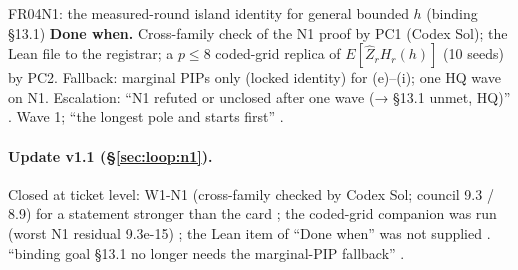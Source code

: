 \begin{card}{FR04}{N1: the measured-round island identity for general bounded $h$ (binding §13.1)}
\textbf{Done when.} Cross-family check of the N1 proof by PC1 (Codex Sol); the Lean file to the registrar; a $p\le8$ coded-grid replica of $E[\hat Z_r H_r(h)]$ (10 seeds) by PC2. Fallback: marginal PIPs only (locked identity) for (e)--(i); one HQ wave on N1. Escalation: ``N1 refuted or unclosed after one wave (→ §13.1 unmet, HQ)'' . Wave 1; ``the longest pole and starts first'' .
\paragraph{Update v1.1 (\S\ref{sec:loop:n1}).} Closed at ticket level: W1-N1  (cross-family checked by Codex Sol; council 9.3 / 8.9) for a statement stronger than the card ; the coded-grid companion was run (worst N1 residual 9.3e-15) ; the Lean item of ``Done when'' was not supplied . ``binding goal §13.1 no longer needs the marginal-PIP fallback'' .

\end{card}

